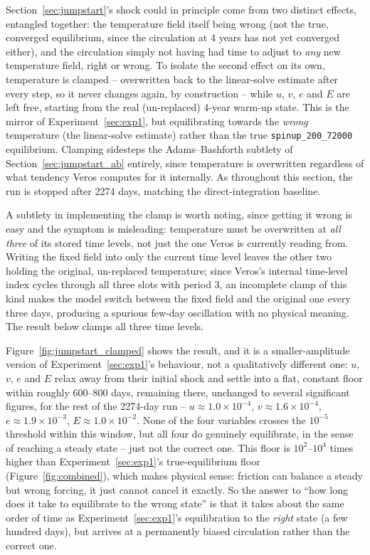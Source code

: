 \documentclass{article}
\begin{document}
Section~\ref{sec:jumpstart}'s shock could in principle come from two distinct effects, entangled together: the temperature field itself being wrong (not the true, converged equilibrium, since the circulation at 4 years has not yet converged either), and the circulation simply not having had time to adjust to \emph{any} new temperature field, right or wrong. To isolate the second effect on its own, temperature is clamped -- overwritten back to the linear-solve estimate after every step, so it never changes again, by construction -- while $u$, $v$, $e$ and $E$ are left free, starting from the real (un-replaced) 4-year warm-up state. This is the mirror of Experiment~\ref{sec:exp1}, but equilibrating towards the \emph{wrong} temperature (the linear-solve estimate) rather than the true \texttt{spinup\_200\_72000} equilibrium. Clamping sidesteps the Adams--Bashforth subtlety of Section~\ref{sec:jumpstart_ab} entirely, since temperature is overwritten regardless of what tendency Veros computes for it internally. As throughout this section, the run is stopped after 2274 days, matching the direct-integration baseline.

A subtlety in implementing the clamp is worth noting, since getting it wrong is easy and the symptom is misleading: temperature must be overwritten at \emph{all three} of its stored time levels, not just the one Veros is currently reading from. Writing the fixed field into only the current time level leaves the other two holding the original, un-replaced temperature; since Veros's internal time-level index cycles through all three slots with period 3, an incomplete clamp of this kind makes the model switch between the fixed field and the original one every three days, producing a spurious few-day oscillation with no physical meaning. The result below clamps all three time levels.

Figure~\ref{fig:jumpstart_clamped} shows the result, and it is a smaller-amplitude version of Experiment~\ref{sec:exp1}'s behaviour, not a qualitatively different one: $u$, $v$, $e$ and $E$ relax away from their initial shock and settle into a flat, constant floor within roughly 600--800 days, remaining there, unchanged to several significant figures, for the rest of the 2274-day run -- $u\approx1.0\times10^{-4}$, $v\approx1.6\times10^{-4}$, $e\approx1.9\times10^{-3}$, $E\approx1.0\times10^{-2}$. None of the four variables crosses the $10^{-5}$ threshold within this window, but all four do genuinely equilibrate, in the sense of reaching a steady state -- just not the correct one. This floor is $10^2$--$10^4$ times higher than Experiment~\ref{sec:exp1}'s true-equilibrium floor (Figure~\ref{fig:combined}), which makes physical sense: friction can balance a steady but wrong forcing, it just cannot cancel it exactly. So the answer to ``how long does it take to equilibrate to the wrong state'' is that it takes about the same order of time as Experiment~\ref{sec:exp1}'s equilibration to the \emph{right} state (a few hundred days), but arrives at a permanently biased circulation rather than the correct one.
\end{document}
